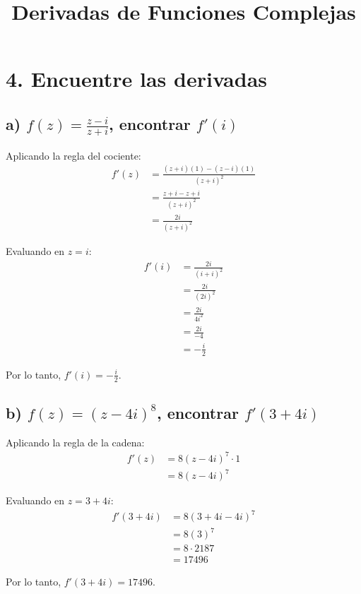 \documentclass{article}
\title{Derivadas de Funciones Complejas}
\author{}
\date{}
\begin{document}
\maketitle

\section*{4. Encuentre las derivadas}

\subsection*{a) $f(z) = \frac{z - i}{z + i}$, encontrar $f'(i)$}

Aplicando la regla del cociente:
\begin{align*}
f'(z) &= \frac{(z + i)(1) - (z - i)(1)}{(z + i)^2} \\
      &= \frac{z + i - z + i}{(z + i)^2} \\
      &= \frac{2i}{(z + i)^2}
\end{align*}

Evaluando en $z = i$:
\begin{align*}
f'(i) &= \frac{2i}{(i + i)^2} \\
      &= \frac{2i}{(2i)^2} \\
      &= \frac{2i}{4i^2} \\
      &= \frac{2i}{-4} \\
      &= -\frac{i}{2}
\end{align*}

Por lo tanto, $f'(i) = -\frac{i}{2}$.

\subsection*{b) $f(z) = (z - 4i)^8$, encontrar $f'(3 + 4i)$}

Aplicando la regla de la cadena:
\begin{align*}
f'(z) &= 8(z - 4i)^7 \cdot 1 \\
      &= 8(z - 4i)^7
\end{align*}

Evaluando en $z = 3 + 4i$:
\begin{align*}
f'(3 + 4i) &= 8(3 + 4i - 4i)^7 \\
           &= 8(3)^7 \\
           &= 8 \cdot 2187 \\
           &= 17496
\end{align*}

Por lo tanto, $f'(3 + 4i) = 17496$.
\end{document}
